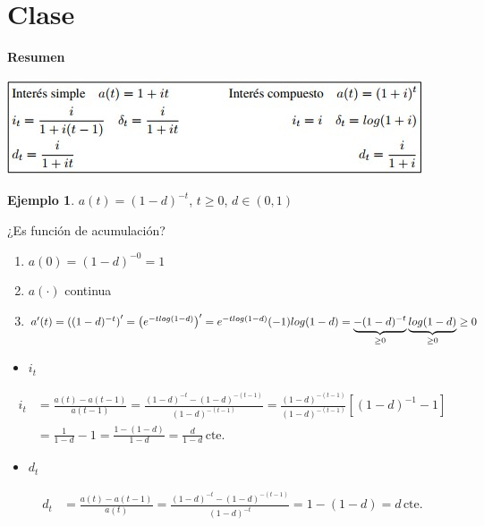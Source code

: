 \documentclass[
]{book}
\providecommand{\tightlist}{%
  \setlength{\itemsep}{0pt}\setlength{\parskip}{0pt}}
\theoremstyle{definition}
\theoremstyle{definition}
\newtheorem{example}{Ejemplo}[chapter]
\theoremstyle{definition}
\theoremstyle{definition}
\theoremstyle{remark}
\begin{document}
\hypertarget{clase}{%
\section{Clase}\label{clase}}

\textbf{Resumen}

\includegraphics{images/5.jpg}

\begin{example}

\(a(t) = (1-d)^{-t}\), \(t\geq 0\), \(d\in (0,1)\)

¿Es función de acumulación?

\begin{enumerate}
\def\labelenumi{\roman{enumi})}
\item
  \(a(0) = (1-d)^{-0} = 1\)
\item
  \(a(\cdot)\) continua
\item
  \(a'(t) = \left( (1-d)^{-t}\right)' = \left( e^{-tlog(1-d)}\right)' = e^{-tlog(1-d)}(-1)log(1-d) \\ = \underbrace{-(1-d)^{-t}}_{\geq 0} \underbrace{log(1-d)}_{\geq 0} \geq 0\)
\end{enumerate}

\end{example}

\begin{itemize}
\tightlist
\item
  \(i_t\)
\end{itemize}

\begin{align*}
i_t &= \frac{a(t)-a(t-1)}{a(t-1)} = \frac{(1-d)^{-t}-(1-d)^{-(t-1)}}{(1-d)^{-(t-1)}} = \frac{(1-d)^{-(t-1)}}{(1-d)^{-(t-1)}}\left[(1-d)^{-1} - 1 \right] \\
&= \frac{1}{1-d}-1 = \frac{1-(1-d)}{1-d} = \boxed{\frac{d}{1-d} \, \text{cte.}}
\end{align*}

\begin{itemize}
\tightlist
\item
  \(d_t\)
\end{itemize}

\begin{align*}
d_t &=  \frac{a(t) - a(t-1)}{a(t)} = \frac{(1-d)^{-t} - (1-d)^{-(t-1)}}{(1-d)^{-t}} = 1-(1-d) = \boxed{d \, \text{cte.}}
\end{align*}
\end{document}
